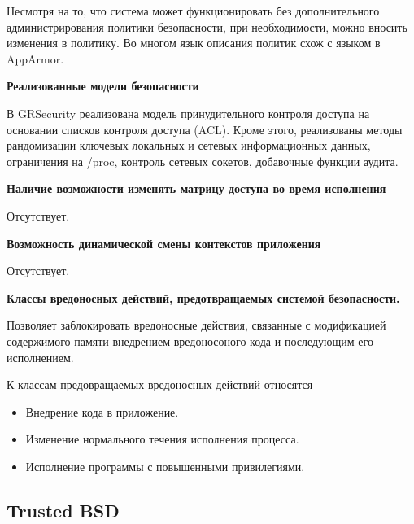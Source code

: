 Несмотря на то, что система может функционировать 
без дополнительного администрирования политики 
безопасности, при необходимости, можно вносить 
изменения в политику. Во многом язык описания 
политик схож с языком в AppArmor. 

\bigskip 
{\bfseries Реализованные модели безопасности} 

В GRSecurity реализована модель принудительного контроля 
доступа на основании списков контроля доступа (ACL).
Кроме этого, реализованы методы рандомизации ключевых 
локальных и сетевых информационных данных, 
ограничения на /proc, контроль сетевых сокетов, 
добавочные функции аудита.   

\bigskip 
{\bfseries Наличие возможности изменять матрицу доступа во время 
	исполнения} 

Отсутствует.

\bigskip 
{\bfseries Возможность динамической смены контекстов приложения} 

Отсутствует. 

\bigskip
{\bfseries Классы вредоносных действий, предотвращаемых 
	системой безопасности.} 

Позволяет заблокировать вредоносные действия, связанные 
с модификацией содержимого памяти внедрением вредоносоного 
кода и последующим его исполнением. 

К классам предовращаемых вредоносных действий относятся 
\begin{itemize} 
\item Внедрение кода в приложение. 
\item Изменение нормального течения исполнения процесса. 
\item Исполнение программы с повышенными привилегиями. 
\end{itemize} 

\bigskip
\subsection{Trusted BSD} 

